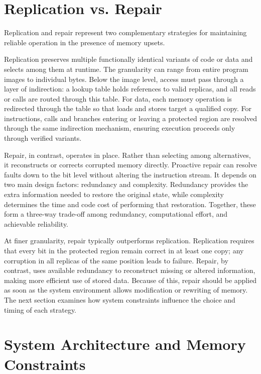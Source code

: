\section{Replication vs. Repair}
\label{sec:replication-vs-repair}

Replication and repair represent two complementary strategies for maintaining reliable operation in the presence of memory upsets.

Replication preserves multiple functionally identical variants of code or data and selects among them at runtime. The granularity can range from entire program images to individual bytes. Below the image level, access must pass through a layer of indirection: a lookup table holds references to valid replicas, and all reads or calls are routed through this table. For data, each memory operation is redirected through the table so that loads and stores target a qualified copy. For instructions, calls and branches entering or leaving a protected region are resolved through the same indirection mechanism, ensuring execution proceeds only through verified variants.

Repair, in contrast, operates in place. Rather than selecting among alternatives, it reconstructs or corrects corrupted memory directly. Proactive repair can resolve faults down to the bit level without altering the instruction stream. It depends on two main design factors: redundancy and complexity. Redundancy provides the extra information needed to restore the original state, while complexity determines the time and code cost of performing that restoration. Together, these form a three-way trade-off among redundancy, computational effort, and achievable reliability.

At finer granularity, repair typically outperforms replication. Replication requires that every bit in the protected region remain correct in at least one copy; any corruption in all replicas of the same position leads to failure. Repair, by contrast, uses available redundancy to reconstruct missing or altered information, making more efficient use of stored data. Because of this, repair should be applied as soon as the system environment allows modification or rewriting of memory. The next section examines how system constraints influence the choice and timing of each strategy.

\section{System Architecture and Memory Constraints}
\label{sec:system-architecture}

